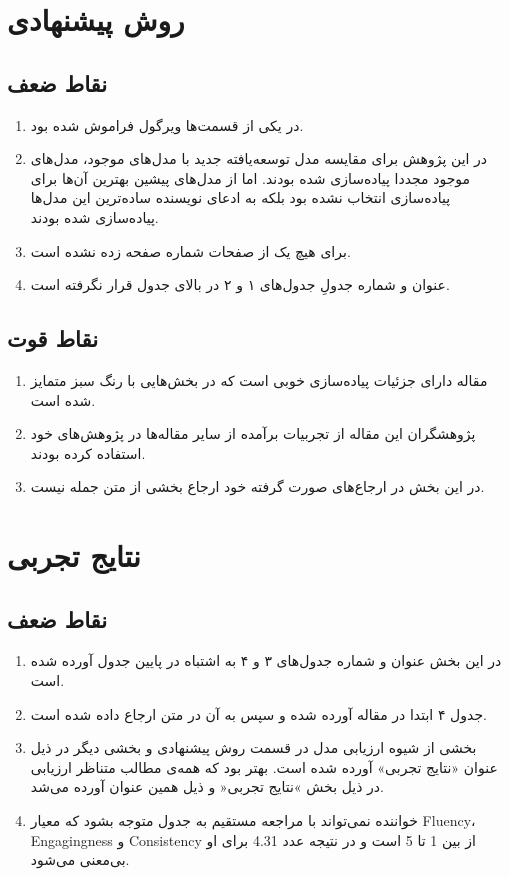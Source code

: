 \documentclass[14pt,a4]{article}
\begin{document}
\section{روش پیشنهادی}

\subsection{نقاط ضعف}

\begin{enumerate}
    \item در یکی از قسمت‌ها ویرگول فراموش شده بود.
    \item در این پژوهش برای مقایسه مدل توسعه‌یافته جدید با مدل‌های موجود، مدل‌های موجود مجددا پیاده‌سازی شده بودند.
    اما از مدل‌های پیشین بهترین آن‌ها برای پیاده‌سازی انتخاب نشده بود بلکه به ادعای نویسنده ساده‌ترین این
    مدل‌ها پیاده‌سازی شده بودند.
    \item برای هیچ یک از صفحات شماره صفحه زده نشده است.
    \item عنوان و شماره جدولِ جدول‌های ۱ و ۲ در بالای جدول قرار نگرفته است.
\end{enumerate}

\subsection{نقاط قوت}

\begin{enumerate}
    \item مقاله دارای جزئیات پیاده‌سازی خوبی است که در بخش‌هایی با رنگ سبز متمایز شده است.
    \item پژوهشگران این مقاله از تجربیات برآمده از سایر مقاله‌ها در پژوهش‌های خود استفاده کرده بودند.
    \item در این بخش در ارجاع‌های صورت گرفته خود ارجاع بخشی از متن جمله نیست.
\end{enumerate}

\section{نتایج تجربی}

\subsection{نقاط ضعف}

\begin{enumerate}
    \item در این بخش عنوان و شماره جدول‌های ۳ و ۴ به اشتباه در پایین جدول آورده شده است.
    \item جدول ۴ ابتدا در مقاله آورده شده و سپس به آن در متن ارجاع داده شده است.
    \item بخشی از شیوه ارزیابی مدل در قسمت روش پیشنهادی و بخشی دیگر در ذیل عنوان «نتایج تجربی» آورده شده است.
    بهتر بود که همه‌ی مطالب متناظر ارزیابی در ذیل بخش »نتایج تجربی« و ذیل همین عنوان آورده می‌شد.
    \item خواننده نمی‌تواند با مراجعه مستقیم به جدول متوجه بشود که معیار Fluency، Engagingness و Consistency
    از بین 1 تا 5 است و در نتیجه عدد 4.31 برای او بی‌معنی می‌شود.
\end{enumerate}
\end{document}
